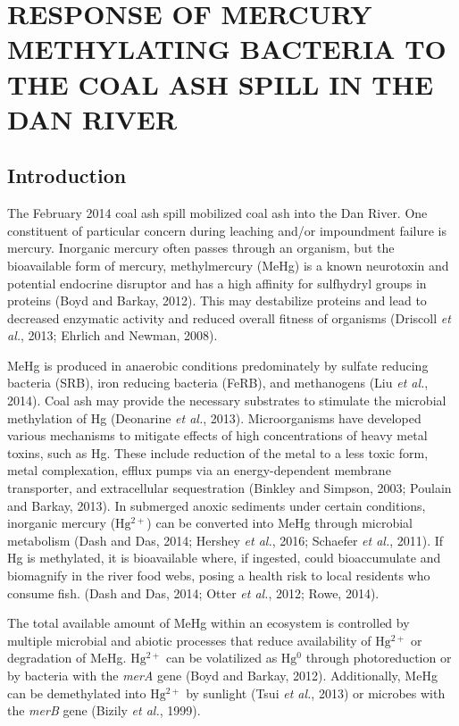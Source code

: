 \documentclass[ms, hidelinks]{uncgdissertationexp}
\theoremstyle{plain}
\theoremstyle{definition}
\theoremstyle{remark}
\begin{document}
\hypertarget{pcr}{%
\chapter{RESPONSE OF MERCURY METHYLATING BACTERIA TO THE COAL ASH SPILL IN THE DAN RIVER}\label{pcr}}

\hypertarget{introduction}{%
\section{Introduction}\label{introduction}}

The February 2014 coal ash spill mobilized coal ash into the Dan River. One constituent of particular concern during leaching and/or impoundment failure is mercury. Inorganic mercury often passes through an organism, but the bioavailable form of mercury, methylmercury (MeHg) is a known neurotoxin and potential endocrine disruptor and has a high affinity for sulfhydryl groups in proteins (Boyd and Barkay, 2012). This may destabilize proteins and lead to decreased enzymatic activity and reduced overall fitness of organisms (Driscoll \emph{et al.}, 2013; Ehrlich and Newman, 2008).

MeHg is produced in anaerobic conditions predominately by sulfate reducing bacteria (SRB), iron reducing bacteria (FeRB), and methanogens (Liu \emph{et al.}, 2014). Coal ash may provide the necessary substrates to stimulate the microbial methylation of Hg (Deonarine \emph{et al.}, 2013). Microorganisms have developed various mechanisms to mitigate effects of high concentrations of heavy metal toxins, such as Hg. These include reduction of the metal to a less toxic form, metal complexation, efflux pumps via an energy-dependent membrane transporter, and extracellular sequestration (Binkley and Simpson, 2003; Poulain and Barkay, 2013).
In submerged anoxic sediments under certain conditions, inorganic mercury (\(\mathrm{Hg^{2+}}\)) can be converted into MeHg through microbial metabolism (Dash and Das, 2014; Hershey \emph{et al.}, 2016; Schaefer \emph{et al.}, 2011). If Hg is methylated, it is bioavailable where, if ingested, could bioaccumulate and biomagnify in the river food webs, posing a health risk to local residents who consume fish. (Dash and Das, 2014; Otter \emph{et al.}, 2012; Rowe, 2014).

The total available amount of MeHg within an ecosystem is controlled by multiple microbial and abiotic processes that reduce availability of \(\mathrm{Hg^{2+}}\) or degradation of MeHg. \(\mathrm{Hg^{2+}}\) can be volatilized as \(\mathrm{Hg^{0}}\) through photoreduction or by bacteria with the \emph{merA} gene (Boyd and Barkay, 2012). Additionally, MeHg can be demethylated into \(\mathrm{Hg^{2+}}\) by sunlight (Tsui \emph{et al.}, 2013) or microbes with the \emph{merB} gene (Bizily \emph{et al.}, 1999).
\end{document}

